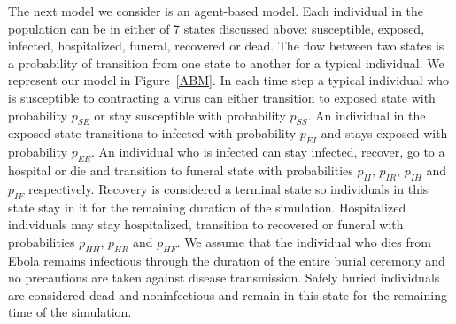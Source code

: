 The next model we consider is an agent-based model. Each individual in the population can be in either of 7 states discussed above: susceptible, exposed, infected, hospitalized, funeral, recovered or dead. The flow between two states is a  probability of transition from one state to another for a typical individual. We represent our model in Figure~\ref{ABM}. In each time step a typical individual who is susceptible to contracting a virus can either transition to exposed state with probability $p_{SE}$ or stay susceptible with probability $p_{SS}$. An individual in the exposed state transitions to infected with probability $p_{EI}$ and stays exposed with probability $p_{EE}$. An individual who is infected can stay infected, recover, go to a hospital or die and transition to funeral state with probabilities $p_{II},\, p_{IR},\, p_{IH}$ and $p_{IF}$ respectively. Recovery is considered a terminal state so individuals in this state stay in it for the remaining duration of the simulation. Hospitalized individuals may stay hospitalized, transition to recovered or funeral with probabilities $p_{HH}, \, p_{HR}$ and $p_{HF}$. We assume that the individual who dies from Ebola remains infectious through the duration of the entire burial ceremony and no precautions are taken against disease transmission. Safely buried individuals are considered dead and noninfectious and remain in this state for the remaining time of the simulation.  

